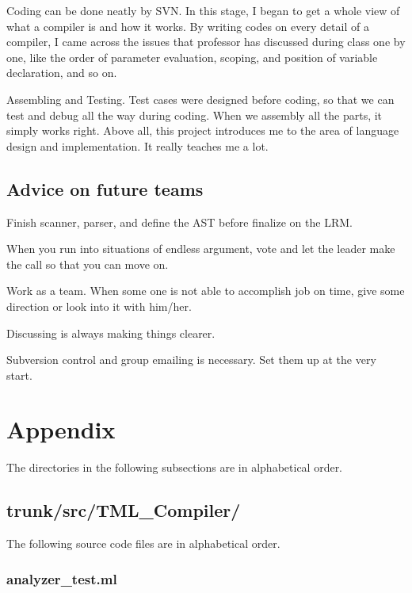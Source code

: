 \documentclass[12pt,psfig,a4]{article}
\begin{document}
Coding can be done neatly by SVN. In this stage, I began to get a whole view of what a compiler is and how it works. By writing codes on every detail of a compiler, I came across the issues that professor has discussed during class one by one, like the order of parameter evaluation, scoping, and position of variable declaration, and so on.

Assembling and Testing. Test cases were designed before coding, so that we can test and debug all the way during coding. When we assembly all the parts, it simply works right.
Above all, this project introduces me to the area of language design and implementation. It really teaches me a lot.

\subsection{Advice on future teams}
Finish scanner, parser, and define the AST before finalize on the LRM.

When you run into situations of endless argument, vote and let the leader make the call so that you can move on.

Work as a team. When some one is not able to accomplish job on time, give some direction or look into it with him/her.

Discussing is always making things clearer.

Subversion control and group emailing is necessary. Set them up at the very start.


\pagebreak
\section{Appendix}
The directories in the following subsections are in alphabetical order.

\subsection{trunk/src/TML\_Compiler/}
The following source code files are in alphabetical order.

\subsubsection{analyzer\_test.ml}		%
\begin{tt}
\lstset{tabsize=2, basicstyle=\scriptsize, numbers=left, numberstyle=\scriptsize, stepnumber=10, numbersep=5pt, breaklines=true, breakatwhitespace=true}
\end{tt}
\end{document}
